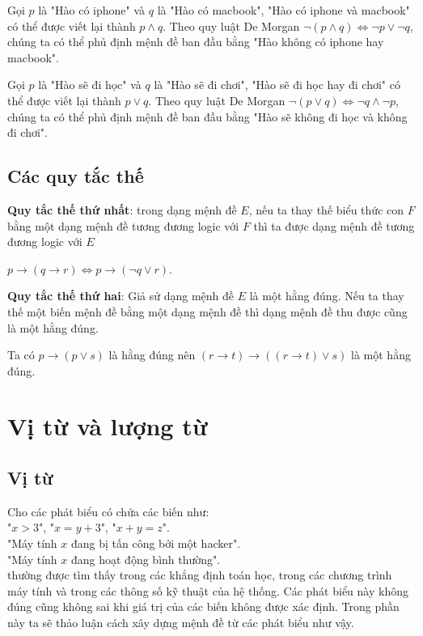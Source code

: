 \documentclass{standalone} %
\begin{document}
        Gọi $p$ là "Hào có iphone" và $q$ là "Hào có macbook", "Hào có iphone và macbook" có thể được viết lại thành $p \land q$. Theo quy luật De Morgan $\neg (p \land q) \Leftrightarrow \neg p \lor \neg q$, chúng ta có thể phủ định mệnh đề ban đầu bằng "Hào không có iphone hay macbook".
            
        Gọi $p$ là "Hào sẽ đi học" và $q$ là "Hào sẽ đi chơi", "Hào sẽ đi học hay đi chơi" có thể được viết lại thành $p \lor q$. Theo quy luật De Morgan $\neg (p \lor q) \Leftrightarrow \neg q \land \neg p$, chúng ta có thể phủ định mệnh đề ban đầu bằng "Hào sẽ không đi học và không đi chơi".
    
    \subsection{Các quy tắc thế}
    
        \begin{theorem}
            \textbf{Quy tắc thế thứ nhất}: trong dạng mệnh đề $E$, nếu ta thay thế biểu thức con $F$ bằng một dạng mệnh đề tương đương logic với $F$ thì ta được dạng mệnh đề tương đương logic với $E$
        \end{theorem}
        
        \begin{example}
            $p \to (q \to r) \Leftrightarrow p \to (\neg q \lor r)$.
        \end{example}
        
        \begin{theorem}
            \textbf{Quy tắc thế thứ hai}: Giả sử dạng mệnh đề $E$ là một hằng đúng. Nếu ta thay thế một biến mệnh đề bằng một dạng mệnh đề thì dạng mệnh đề thu được cũng là một hằng đúng.
        \end{theorem}
        
        \begin{example}
            Ta có $p \to (p \lor s)$ là hằng đúng nên $(r \to t) \to ((r \to t) \lor s)$ là một hằng đúng.
        \end{example}
        
    \section{Vị từ và lượng từ}
    \subsection{Vị từ}
        Cho các phát biểu có chứa các biến như:\\
        "$x > 3$", "$x = y + 3$", "$x + y = z$".\\
        "Máy tính $x$ đang bị tấn công bởi một hacker".\\
        "Máy tính $x$ đang hoạt động bình thường".\\
        thường được tìm thấy trong các khẳng định toán học, trong các chương trình máy tính và trong các thông số kỹ thuật của hệ thống. Các phát biểu này không đúng cũng không sai khi giá trị của các biến không được xác định. Trong phần này ta sẽ thảo luận cách xây dựng mệnh đề từ các phát biểu như vậy.
        
\end{document}
